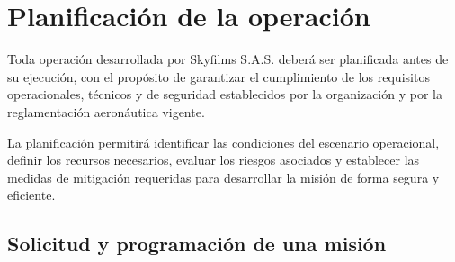 \section{Planificación de la operación}

Toda operación desarrollada por Skyfilms S.A.S. deberá ser planificada antes de su ejecución, con el propósito de garantizar el cumplimiento de los requisitos operacionales, técnicos y de seguridad establecidos por la organización y por la reglamentación aeronáutica vigente.

La planificación permitirá identificar las condiciones del escenario operacional, definir los recursos necesarios, evaluar los riesgos asociados y establecer las medidas de mitigación requeridas para desarrollar la misión de forma segura y eficiente.



\subsection{Solicitud y programación de una misión}

